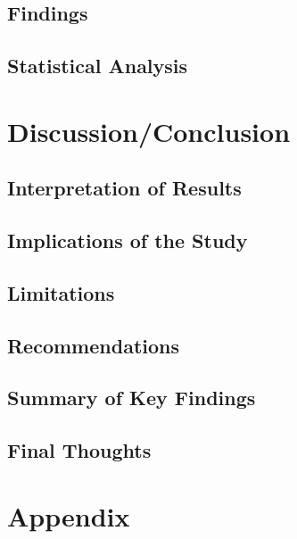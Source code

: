 \documentclass[
  11pt,
  letterpaper,
  DIV=11,
  numbers=noendperiod]{scrartcl}
\begin{document}
\hypertarget{findings}{%
\subsection{Findings}\label{findings}}

\hypertarget{statistical-analysis}{%
\subsection{Statistical Analysis}\label{statistical-analysis}}

\hypertarget{discussionconclusion}{%
\section{Discussion/Conclusion}\label{discussionconclusion}}

\hypertarget{interpretation-of-results}{%
\subsection{Interpretation of Results}\label{interpretation-of-results}}

\hypertarget{implications-of-the-study}{%
\subsection{Implications of the Study}\label{implications-of-the-study}}

\hypertarget{limitations}{%
\subsection{Limitations}\label{limitations}}

\hypertarget{recommendations}{%
\subsection{Recommendations}\label{recommendations}}

\hypertarget{summary-of-key-findings}{%
\subsection{Summary of Key Findings}\label{summary-of-key-findings}}

\hypertarget{final-thoughts}{%
\subsection{Final Thoughts}\label{final-thoughts}}

\hypertarget{appendix}{%
\section{Appendix}\label{appendix}}
\end{document}
